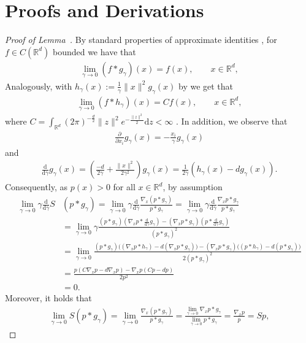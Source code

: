 \documentclass{article}
\newcommand{\R}{\mathbb{R}}
\theoremstyle{plain}
\theoremstyle{definition}
\theoremstyle{remark}
\renewcommand{\d}{\mathrm{d}}
\newcommand{\grad}[1]{\nabla_{\! #1}}
\newcommand{\ddgamma}{\tfrac{\d}{\d\gamma}}
\newcommand{\ddxi}{\tfrac{\partial}{\partial x_i}}
\begin{document}
\section{Proofs and Derivations}\label{sec:proofs}
\begin{proof}[Proof of Lemma~]
    By standard properties of approximate identities \citep[{Example~1.2.17 and Theorem~1.2.19(2)}]{grafakos-2014},
    for $f\in C(\R^d)$ bounded we have that
    \begin{align*}
        \lim_{\gamma\to 0} (f*g_\gamma)(x)
        = f(x),\qquad x\in\R^d,
    \end{align*} 
    Analogously, with $h_\gamma(x):=\tfrac{1}{\gamma}\|x\|^2 g_\gamma(x)$ by  \citep[Theorem~1.2.21(b)]{grafakos-2014}  we get that
    \begin{align*}
        \lim_{\gamma\to 0} (f*h_\gamma)(x) = C f(x),\qquad x\in\R^d,
    \end{align*}
    where $C=\int_{\R^d} (2\pi)^{-\frac{d}{2}} \|z\|^2e^{-\frac{\|z\|^2}{2}}  \d z < \infty$ . In addition, we observe that
    \begin{align*}
        \ddxi g_\gamma(x)=-\tfrac{x_i}{\gamma}g_\gamma(x)
    \end{align*}
    and
    \begin{align*}
        \ddgamma g_\gamma(x) = (\tfrac{-d}{2\gamma}+\tfrac{\|x\|^2}{2\gamma^2})g_\gamma(x) = \tfrac{1}{2\gamma}(h_\gamma(x)-dg_\gamma(x)). 
    \end{align*}
    Consequently, as $p(x)>0$ for all $x\in\R^d$, by assumption
    \begin{align*}
        \lim_{\gamma\to 0} \gamma\ddgamma S&(p*g_\gamma)
        = \lim_{\gamma\to 0} \gamma\ddgamma\frac{\nabla_x(p*g_\gamma)}{p*g_\gamma}=\lim_{\gamma\to 0} \gamma\ddgamma\frac{\nabla_x p*g_\gamma}{p*g_\gamma}\\
        &=\lim_{\gamma\to 0} \gamma \frac{(p*g_\gamma)(\nabla_xp*\ddgamma g_\gamma)-(\nabla_x p*g_\gamma)(p*\ddgamma g_\gamma)}{(p*g_\gamma)^2}\\
        &=\lim_{\gamma\to 0} \frac{(p*g_\gamma)\big((\nabla_x p* h_\gamma)-d(\nabla_x p* g_\gamma)\big)-(\nabla_x p*g_\gamma)\big(( p* h_\gamma)-d( p* g_\gamma)\big)}{2(p*g_\gamma)^2}\\
        &=\frac{p(C\nabla_x p -d\nabla_x p)- \nabla_x p (Cp-dp)}{2p^2}\\
        &=0.
    \end{align*}
    Moreover, it holds that
    \begin{align*}
        \lim_{\gamma\to 0}S(p*g_\gamma) = \lim_{\gamma\to 0} \frac{\grad{x}(p*g_\gamma)}{p*g_\gamma}=\frac{\lim_{\gamma\to 0}\grad{x}p*g_\gamma}{\lim_{\gamma\to 0}p*g_\gamma}=\frac{\grad{x}p}{p}=Sp,

\end{align*}
\end{proof}
\end{document}
